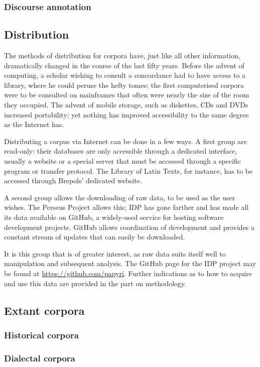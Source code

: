 \subsubsection{Discourse annotation}
\subsection{Distribution}
\label{subsect:distribution}
The methods of distribution for corpora have, just like all other information,
dramatically changed in the course of the last fifty years. Before the advent
of computing, a scholar wishing to consult a concordance had to have access to
a library, where he could peruse the hefty tomes; the first computerised
corpora were to be consulted on mainframes that often were nearly the size of
the room they occupied. The advent of mobile storage, such as diskettes, CDs
and DVDs increased portability; yet nothing has improved accessibility to the
same degree as the Internet has.

 Distributing a corpus via Internet can be
done in a few ways. A first group are read-only: their databases are only
accessible through a dedicated interface, usually a website or a special server
that must be accessed through a specific program or transfer protocol. The
Library of Latin Texts, for instance, has to be accessed through Brepols'
dedicated website. 

 A second group allows the downloading of raw data, to be
used as the user wishes. The Perseus Project allows this; IDP has gone farther
and has made all its data available on GitHub, a widely-used service for
hosting software development projects. GitHub allows coordination of
development and provides a constant stream of updates that can easily be
downloaded.

 It is this group that is of greater interest, as raw data suits
itself well to manipulation and subsequent analysis. The GitHub page for the
IDP project may be found at \url{https://github.com/papyri}. Further
indications as to how to acquire and use this data are provided in the part on
methodology.
\subsection{Extant corpora}
\label{subsect:extantcorpora}
\subsubsection{Historical corpora}
\label{subsubsect:historicalcorpora}
\subsubsection{Dialectal corpora}
\label{subsubsect:dialectalcorpora}
